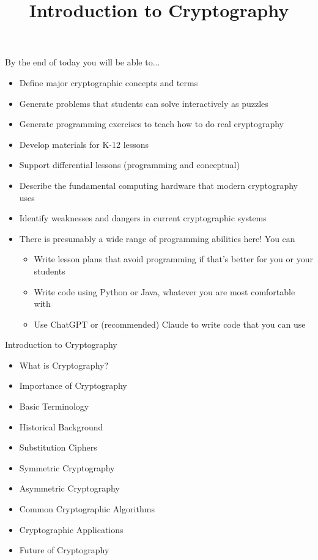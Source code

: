 

\title[]{Introduction to Cryptography}

\begin{frame}
\titlepage
\end{frame}

\begin{withoutheadline}

\begin{frame}{By the end of today you will be able to...}
\begin{itemize}
    \item Define major cryptographic concepts and terms
    \item Generate problems that students can solve interactively as puzzles
    \item Generate programming exercises to teach how to do real cryptography
    \item Develop materials for K-12 lessons
    \item Support differential lessons (programming and conceptual)
    \item Describe the fundamental computing hardware that modern cryptography uses
    \item Identify weaknesses and dangers in current cryptographic systems
    \item There is presumably a wide range of programming abilities here! You can
    \begin{itemize}
        \item Write lesson plans that avoid programming if that's better for you or your students
        \item Write code using Python or Java, whatever you are most comfortable with
        \item Use ChatGPT or (recommended) Claude to write code that you can use
    \end{itemize}
\end{itemize}
\end{frame}
        
\begin{frame}{Introduction to Cryptography}
\begin{itemize}
    \item What is Cryptography?
    \item Importance of Cryptography
    \item Basic Terminology
    \item Historical Background
    \item Substitution Ciphers
    \item Symmetric Cryptography
    \item Asymmetric Cryptography
    \item Common Cryptographic Algorithms
    \item Cryptographic Applications
    \item Future of Cryptography
\end{itemize}
\end{frame}


\end{withoutheadline}

